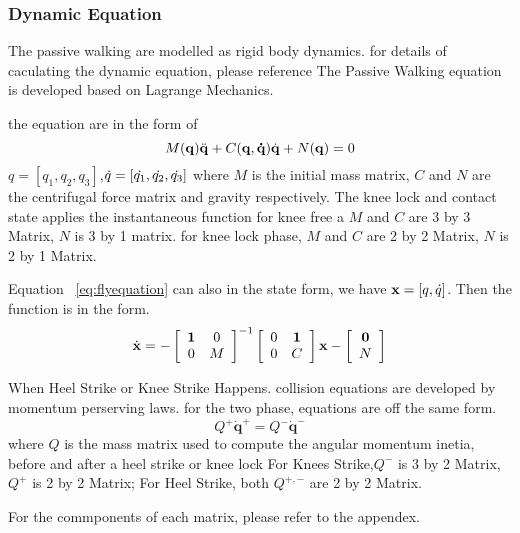 \subsubsection*{Dynamic Equation}

The passive walking are modelled as rigid body dynamics.
for details of caculating the dynamic equation, please reference\citep{Chen2007}
The Passive Walking equation is developed based on Lagrange Mechanics.


\begin{itemize}
the equation are in the form of 
\begin{equation}
\label{eq:flyequation}
M(\mathbf{q}) \ddot{\mathbf{q}} + C(\mathbf{q,\dot{q}})\dot{\mathbf{q}} + N(\mathbf{q}) = 0
\end{equation}
$q=[q_1,q_2,q_3]$,$\dot{q}=[\dot{q_1},\dot{q_2},\dot{q_3}]$
where $M$ is the initial mass matrix, $C$ and $N$ are the centrifugal force matrix and gravity respectively. The knee lock and contact state applies the instantaneous function
for knee free a  $M$ and $C$ are 3 by 3 Matrix, $N$ is 3 by 1 matrix.
for knee lock phase, $M$ and $C$ are 2 by 2 Matrix, $N$ is 2 by 1 Matrix.


Equation ~\ref{eq:flyequation} can also in the state form, we have $\mathbf{x}=[q,\dot{q}]$.
Then the function is in the form.
\begin{equation}
\dot{\mathbf{x}}=
-\left[ 
\begin{array}{cc}
\mathbf{1} &0\\
0 &M 
\end{array}
\right]^{-1}
\left[ 
\begin{array}{cc}
0 &\mathbf{1}\\
0 &C 
\end{array}
\right]\mathbf{x}
-\left[ 
\begin{array}{c}
\mathbf{0}\\
 N 
\end{array}
\right]
\end{equation}

When Heel Strike or Knee Strike Happens.
collision equations are developed by momentum perserving laws.
for the two phase, equations are off the same form.
\begin{equation}
Q^{+}\dot{\mathbf{q}}^{+} = Q^{-}\dot{\mathbf{q}}^{-}
\end{equation}
where $Q$ is the mass matrix used to compute the angular momentum inetia, before and after a heel strike or knee lock
For Knees Strike,$Q^-$ is 3 by 2 Matrix, $Q^+$ is 2 by 2 Matrix;
For Heel Strike, both $Q^{+,-}$ are 2 by 2 Matrix.
\end{itemize}
For the commponents of each matrix, please refer to the appendex.





